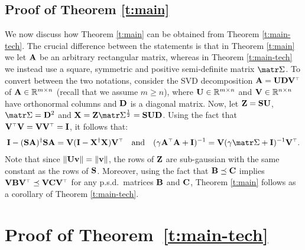\documentclass[../../thesis.tex]{subfiles}
\begin{document}
\subsection{Proof of Theorem \ref{t:main}}\label{s:reduction}
We now discuss how Theorem \ref{t:main} can be obtained from Theorem
\ref{t:main-tech}. The crucial difference between the statements is
that in Theorem \ref{t:main} we let $\A$ be an arbitrary rectangular
matrix, whereas in Theorem \ref{t:main-tech} we instead use a square,
symmetric and positive semi-definite matrix $\Sigmab$. To convert between the
two notations, consider the SVD decomposition
$\A=\U\D\V^\top$ of $\A \in \R^{m \times n}$ (recall that we assume $m
  \ge n$), where $\U\in\R^{m\times n}$ and $\V\in\R^{n\times
    n}$ have orthonormal columns and $\D$ is a diagonal matrix. Now, let
$\Z = \S\U$, $\Sigmab=\D^2$ and
$\X=\Z\Sigmab^{\frac12}=\S\U\D$. Using the fact that
$\V^\top\V=\V\V^\top=\I$, it follows that:
\begin{align*}
  \I - (\S\A)^\dagger\S\A = \V(\I-\X^\dagger\X)\V^\top\quad\text{and}\quad
  (\gamma\A^\top\A+\I)^{-1} = \V(\gamma\Sigmab + \I)^{-1}\V^\top.
\end{align*}
Note that since $\|\U\v\|=\|\v\|$, the rows of $\Z$ are
sub-gaussian with the same constant as the rows of $\S$. Moreover,
using the fact that $\B\preceq\C$ implies
$\V\B\V^\top\preceq\V\C\V^\top$ for any p.s.d.~matrices $\B$ and $\C$,
Theorem \ref{t:main} follows as a corollary of Theorem \ref{t:main-tech}.


\section{Proof of Theorem~\ref{t:main-tech}}
\label{sec:proof-of-theo-main-tech}
\end{document}
